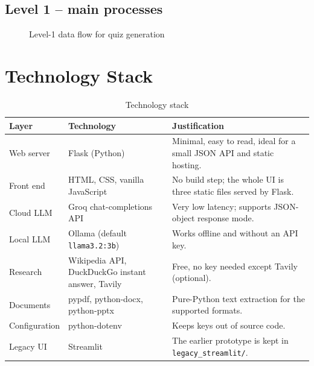 \subsection{Level 1 -- main processes}
\begin{figure}[H]
\centering
{}
\caption{Level-1 data flow for quiz generation}
\label{fig:dfd1}
\end{figure}

\section{Technology Stack}
\begin{table}[H]
\centering
\begin{tabularx}{\textwidth}{@{} p{3.2cm} p{3.4cm} X @{}}
\toprule
\textbf{Layer} & \textbf{Technology} & \textbf{Justification} \\
\midrule
Web server & Flask (Python) & Minimal, easy to read, ideal for a small JSON API and static hosting. \\
Front end & HTML, CSS, vanilla JavaScript & No build step; the whole UI is three static files served by Flask. \\
Cloud LLM & Groq chat-completions API & Very low latency; supports JSON-object response mode. \\
Local LLM & Ollama (default \texttt{llama3.2:3b}) & Works offline and without an API key. \\
Research & Wikipedia API, DuckDuckGo instant answer, Tavily & Free, no key needed except Tavily (optional). \\
Documents & pypdf, python-docx, python-pptx & Pure-Python text extraction for the supported formats. \\
Configuration & python-dotenv & Keeps keys out of source code. \\
Legacy UI & Streamlit & The earlier prototype is kept in \texttt{legacy\_streamlit/}. \\
\bottomrule
\end{tabularx}
\caption{Technology stack}
\label{tab:stack}
\end{table}
